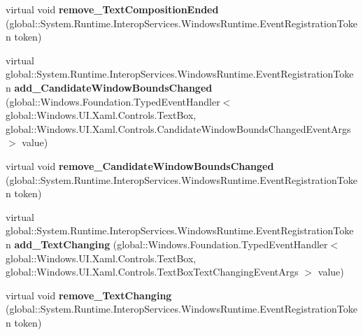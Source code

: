 \begin{DoxyCompactItemize}
\item 
\mbox{\label{class_windows_1_1_u_i_1_1_xaml_1_1_controls_1_1_text_box_a5973df0b80c264046f580c78b04aeb61}} 
virtual void {\bfseries remove\+\_\+\+Text\+Composition\+Ended} (global\+::\+System.\+Runtime.\+Interop\+Services.\+Windows\+Runtime.\+Event\+Registration\+Token token)
\item 
\mbox{\label{class_windows_1_1_u_i_1_1_xaml_1_1_controls_1_1_text_box_a0f417de69db14b9dda18a6b486367ec7}} 
virtual global\+::\+System.\+Runtime.\+Interop\+Services.\+Windows\+Runtime.\+Event\+Registration\+Token {\bfseries add\+\_\+\+Candidate\+Window\+Bounds\+Changed} (global\+::\+Windows.\+Foundation.\+Typed\+Event\+Handler$<$ global\+::\+Windows.\+U\+I.\+Xaml.\+Controls.\+Text\+Box, global\+::\+Windows.\+U\+I.\+Xaml.\+Controls.\+Candidate\+Window\+Bounds\+Changed\+Event\+Args $>$ value)
\item 
\mbox{\label{class_windows_1_1_u_i_1_1_xaml_1_1_controls_1_1_text_box_a69264830074f27caa404569cb91f24af}} 
virtual void {\bfseries remove\+\_\+\+Candidate\+Window\+Bounds\+Changed} (global\+::\+System.\+Runtime.\+Interop\+Services.\+Windows\+Runtime.\+Event\+Registration\+Token token)
\item 
\mbox{\label{class_windows_1_1_u_i_1_1_xaml_1_1_controls_1_1_text_box_acb77f51967d36ae23348c70a69fb0313}} 
virtual global\+::\+System.\+Runtime.\+Interop\+Services.\+Windows\+Runtime.\+Event\+Registration\+Token {\bfseries add\+\_\+\+Text\+Changing} (global\+::\+Windows.\+Foundation.\+Typed\+Event\+Handler$<$ global\+::\+Windows.\+U\+I.\+Xaml.\+Controls.\+Text\+Box, global\+::\+Windows.\+U\+I.\+Xaml.\+Controls.\+Text\+Box\+Text\+Changing\+Event\+Args $>$ value)
\item 
\mbox{\label{class_windows_1_1_u_i_1_1_xaml_1_1_controls_1_1_text_box_aacef19be208dde1a5d0585bc1113f0bd}} 
virtual void {\bfseries remove\+\_\+\+Text\+Changing} (global\+::\+System.\+Runtime.\+Interop\+Services.\+Windows\+Runtime.\+Event\+Registration\+Token token)
\item 
\mbox{\label{class_windows_1_1_u_i_1_1_xaml_1_1_controls_1_1_text_box_adcfa94babf525333e555cfc9f2b34314}} 

\end{DoxyCompactItemize}
